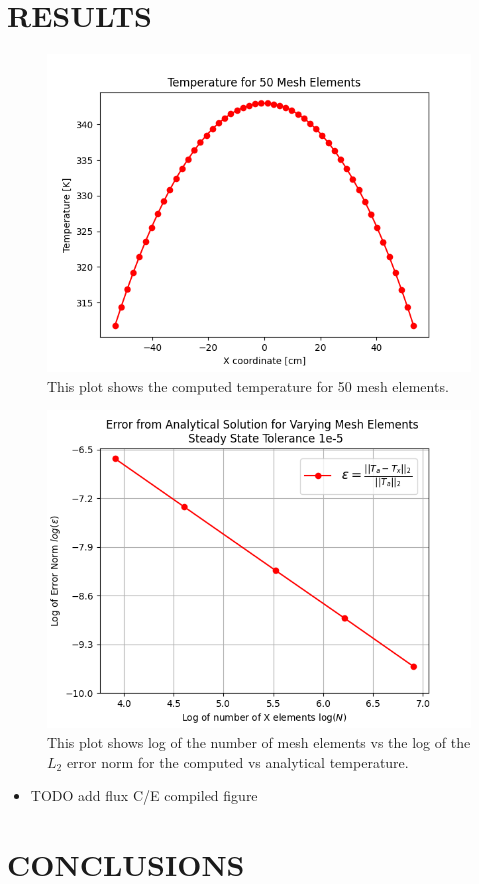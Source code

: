 \documentclass[letterpaper]{mc2023}
\begin{document}
\section{RESULTS}\label{sec:results}

\begin{figure}[H]
    \centering
    \includegraphics[width=0.7\linewidth]{figures/temp_50.png}
    \caption{This plot shows the computed temperature for 50 mesh elements.}
    \label{fig:temp50}
\end{figure}

\begin{figure}[H]
    \centering
    \includegraphics[width=0.7\linewidth]{figures/error_study.png}
    \caption{This plot shows log of the number of mesh elements vs the log of the $L_{2}$ error norm for the computed vs analytical temperature.}
    \label{fig:}
\end{figure}
\begin{itemize}
    \item TODO add flux C/E compiled figure
\end{itemize}
\section{CONCLUSIONS}\label{sec:conclusions}
\end{document}
